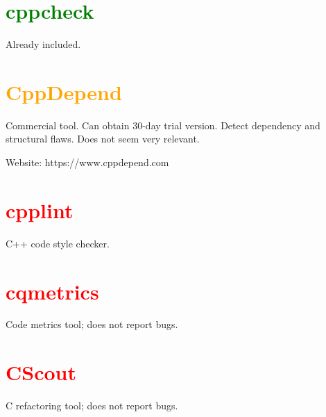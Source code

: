 \documentclass[10pt,letterpaper]{article}
\begin{document}
\section{\textcolor{green}{cppcheck}}

Already included.

\section{\textcolor{orange}{CppDepend}}

Commercial tool. Can obtain 30-day trial version. Detect dependency and
structural flaws. Does not seem very relevant.

Website: https://www.cppdepend.com

\section{\textcolor{red}{cpplint}}

C++ code style checker.

\section{\textcolor{red}{cqmetrics}}

Code metrics tool; does not report bugs.

\section{\textcolor{red}{CScout}}

C refactoring tool; does not report bugs.
\end{document}
